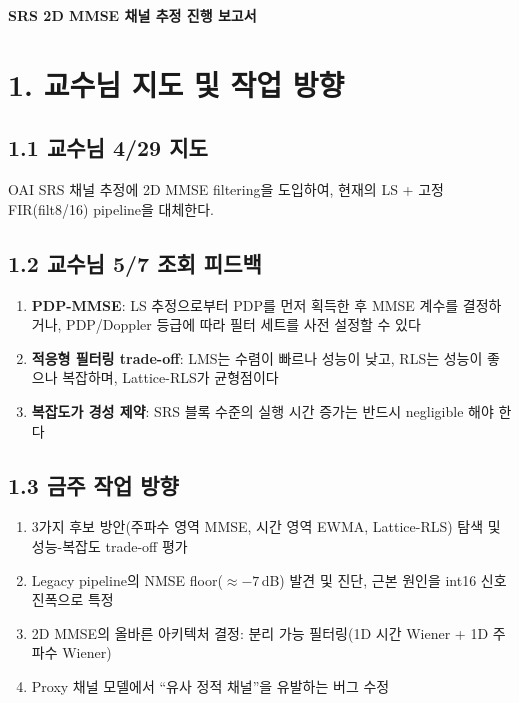 \documentclass[11pt,a4paper]{article}
\begin{document}
\begin{center}
{\LARGE\bfseries SRS 2D MMSE 채널 추정 진행 보고서}\\[0.8em]
\end{center}

\vspace{1em}

\section{1. 교수님 지도 및 작업 방향}

\subsection{1.1 교수님 4/29 지도}

OAI SRS 채널 추정에 2D MMSE filtering을 도입하여, 현재의 LS + 고정 FIR(filt8/16) pipeline을 대체한다.

\subsection{1.2 교수님 5/7 조회 피드백}

\begin{enumerate}[leftmargin=2em]
\item \textbf{PDP-MMSE}: LS 추정으로부터 PDP를 먼저 획득한 후 MMSE 계수를 결정하거나, PDP/Doppler 등급에 따라 필터 세트를 사전 설정할 수 있다
\item \textbf{적응형 필터링 trade-off}: LMS는 수렴이 빠르나 성능이 낮고, RLS는 성능이 좋으나 복잡하며, Lattice-RLS가 균형점이다
\item \textbf{복잡도가 경성 제약}: SRS 블록 수준의 실행 시간 증가는 반드시 negligible 해야 한다
\end{enumerate}

\subsection{1.3 금주 작업 방향}

\begin{enumerate}[leftmargin=2em]
\item 3가지 후보 방안(주파수 영역 MMSE, 시간 영역 EWMA, Lattice-RLS) 탐색 및 성능-복잡도 trade-off 평가
\item Legacy pipeline의 NMSE floor($\approx -7$\,dB) 발견 및 진단, 근본 원인을 int16 신호 진폭으로 특정
\item 2D MMSE의 올바른 아키텍처 결정: 분리 가능 필터링(1D 시간 Wiener + 1D 주파수 Wiener)
\item Proxy 채널 모델에서 ``유사 정적 채널''을 유발하는 버그 수정
\end{enumerate}
\end{document}
